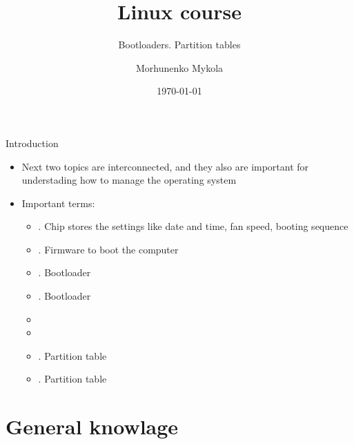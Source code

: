 \documentclass[usenames,dvipsnames,10pt,aspectratio=169]{beamer}
\title{Linux course}
\subtitle{Bootloaders. Partition tables}
\date[\today]{\small\today}
\author[Morhunenko Mykola]{Morhunenko Mykola}
\institute{APPS@UCU}
\begin{document}
\begin{frame}
\titlepage
\end{frame}

\begin{frame}{Introduction}
    \begin{itemize}
        \item Next two topics are interconnected, and they also are important for understading how to manage the operating system
        \item Important terms:
        \begin{itemize}
            \item {}. Chip stores the settings like date and time, fan speed, booting sequence
            \item {}. Firmware to boot the computer
            \item {}. Bootloader
            \item {}. Bootloader
            \item {}
            \item {}
            \item {}. Partition table
            \item {}. Partition table 
        \end{itemize}
    \end{itemize}
\end{frame}

\begin{frame}{\contentsname}
    \tableofcontents
\end{frame}

\section{General knowlage}
\end{document}
